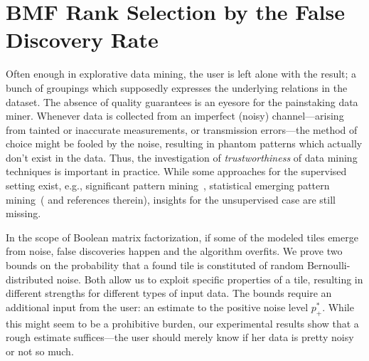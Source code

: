 \chapter{BMF Rank Selection by the False Discovery Rate}
\label{chap:RankFDR}

Often enough in explorative data mining, the user is left alone with the result; a bunch of groupings which supposedly expresses the underlying relations in the dataset. The absence of quality guarantees is an eyesore for the painstaking data miner.
Whenever data is collected from an imperfect (noisy) channel---arising from tainted or inaccurate measurements, or transmission errors---the method of choice might be fooled by the noise, resulting in phantom patterns which actually don't exist in the data. Thus, the investigation of \emph{trustworthiness} of data mining techniques is important in practice. While some approaches for the supervised setting exist, e.g., significant pattern mining~\citep{llinares2015fast}, statistical emerging pattern mining~(\cite{komiyama2017statistical} and references therein), insights for the unsupervised case are still missing. 

In the scope of Boolean matrix factorization, if some of the modeled tiles emerge from noise, false discoveries happen and the algorithm overfits.
We prove two bounds on the probability that a found tile is constituted of random Bernoulli-distributed noise. Both allow us to exploit specific properties of a tile, resulting in different strengths for different types of input data.
The bounds require an additional input from the user: an estimate to the positive noise level $p_+^*$. While this might seem to be a prohibitive burden, our experimental results show that a rough estimate suffices---the user should merely know if her data is pretty noisy or not so much.

